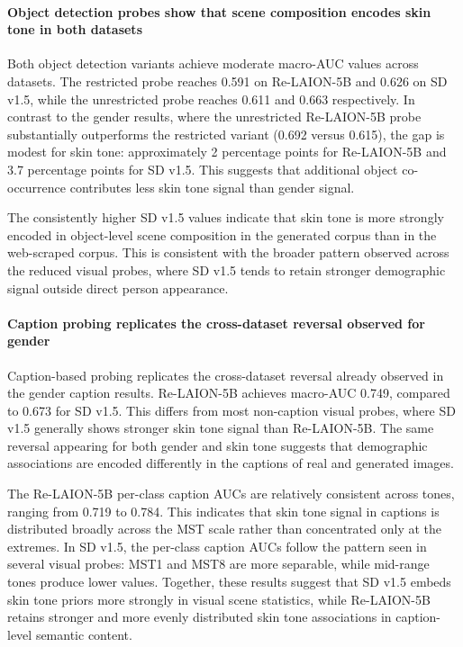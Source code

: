 \paragraph{Object detection probes show that scene composition encodes skin tone in both datasets}

Both object detection variants achieve moderate macro-AUC values across datasets. The restricted probe reaches 0.591 on Re-LAION-5B and 0.626 on SD v1.5, while the unrestricted probe reaches 0.611 and 0.663 respectively. In contrast to the gender results, where the unrestricted Re-LAION-5B probe substantially outperforms the restricted variant (0.692 versus 0.615), the gap is modest for skin tone: approximately 2 percentage points for Re-LAION-5B and 3.7 percentage points for SD v1.5. This suggests that additional object co-occurrence contributes less skin tone signal than gender signal.

The consistently higher SD v1.5 values indicate that skin tone is more strongly encoded in object-level scene composition in the generated corpus than in the web-scraped corpus. This is consistent with the broader pattern observed across the reduced visual probes, where SD v1.5 tends to retain stronger demographic signal outside direct person appearance.

\paragraph{Caption probing replicates the cross-dataset reversal observed for gender}

Caption-based probing replicates the cross-dataset reversal already observed in the gender caption results. Re-LAION-5B achieves macro-AUC 0.749, compared to 0.673 for SD v1.5. This differs from most non-caption visual probes, where SD v1.5 generally shows stronger skin tone signal than Re-LAION-5B. The same reversal appearing for both gender and skin tone suggests that demographic associations are encoded differently in the captions of real and generated images.

The Re-LAION-5B per-class caption AUCs are relatively consistent across tones, ranging from 0.719 to 0.784. This indicates that skin tone signal in captions is distributed broadly across the MST scale rather than concentrated only at the extremes. In SD v1.5, the per-class caption AUCs follow the pattern seen in several visual probes: MST1 and MST8 are more separable, while mid-range tones produce lower values. Together, these results suggest that SD v1.5 embeds skin tone priors more strongly in visual scene statistics, while Re-LAION-5B retains stronger and more evenly distributed skin tone associations in caption-level semantic content.

